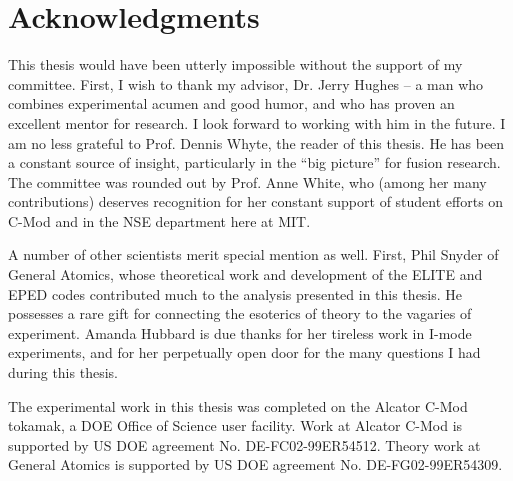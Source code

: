 
\chapter*{Acknowledgments}


This thesis would have been utterly impossible without the support of my committee.  First, I wish to thank my advisor, Dr. Jerry Hughes -- a man who combines experimental acumen and good humor, and who has proven an excellent mentor for research.  I look forward to working with him in the future.  I am no less grateful to Prof. Dennis Whyte, the reader of this thesis.  He has been a constant source of insight, particularly in the ``big picture'' for fusion research.  The committee was rounded out by Prof. Anne White, who (among her many contributions) deserves recognition for her constant support of student efforts on C-Mod and in the NSE department here at MIT.

A number of other scientists merit special mention as well.  First, Phil Snyder of General Atomics, whose theoretical work and development of the ELITE and EPED codes contributed much to the analysis presented in this thesis.  He possesses a rare gift for connecting the esoterics of theory to the vagaries of experiment.  Amanda Hubbard is due thanks for her tireless work in I-mode experiments, and for her perpetually open door for the many questions I had during this thesis.

The experimental work in this thesis was completed on the Alcator C-Mod tokamak, a DOE Office of Science user facility.  Work at Alcator C-Mod is supported by US DOE agreement No. DE-FC02-99ER54512.  Theory work at General Atomics is supported by US DOE agreement No. DE-FG02-99ER54309.